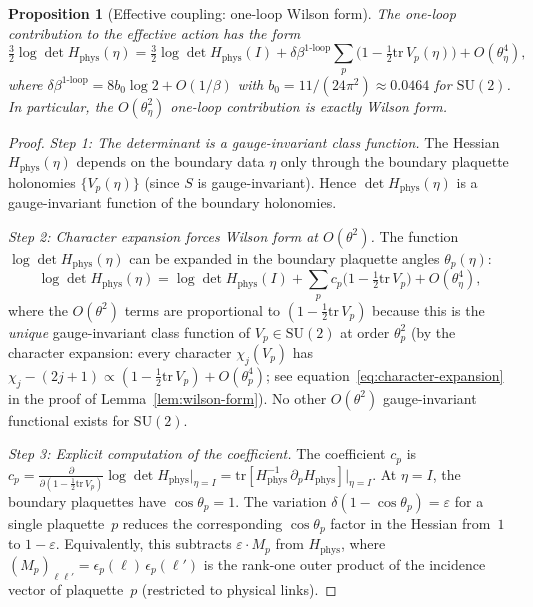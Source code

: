 \documentclass[11pt]{article}
\newtheorem{proposition}[theorem]{Proposition}
\theoremstyle{definition}
\newcommand{\SU}{\mathrm{SU}}
\newcommand{\tr}{\mathrm{tr}}
\begin{document}
\begin{proposition}[Effective coupling: one-loop Wilson form]%
\label{prop:betaeff}
The one-loop contribution to the effective action has the form
\begin{equation}\label{eq:betaeff}
\tfrac{3}{2}\log\det H_{\mathrm{phys}}(\eta)
=\tfrac{3}{2}\log\det H_{\mathrm{phys}}(I)
+\delta\beta^{1\text{-loop}}\sum_p
\bigl(1-\tfrac{1}{2}\tr\,V_p(\eta)\bigr)
+O(\theta_\eta^4),
\end{equation}
where $\delta\beta^{1\text{-loop}}=8b_0\log 2+O(1/\beta)$
with $b_0=11/(24\pi^2)\approx 0.0464$ for $\SU(2)$.
In particular, the $O(\theta_\eta^2)$ one-loop contribution
is \emph{exactly Wilson form}.
\end{proposition}

\begin{proof}
\emph{Step 1: The determinant is a gauge-invariant class function.}
The Hessian $H_{\mathrm{phys}}(\eta)$ depends on the boundary data
$\eta$ only through the boundary plaquette holonomies
$\{V_p(\eta)\}$ (since $S$ is gauge-invariant).  Hence
$\det H_{\mathrm{phys}}(\eta)$ is a gauge-invariant function
of the boundary holonomies.

\emph{Step 2: Character expansion forces Wilson form at $O(\theta^2)$.}
The function $\log\det H_{\mathrm{phys}}(\eta)$ can be expanded
in the boundary plaquette angles $\theta_p(\eta)$:
\[
\log\det H_{\mathrm{phys}}(\eta)
=\log\det H_{\mathrm{phys}}(I)
+\sum_p c_p\bigl(1-\tfrac{1}{2}\tr\,V_p\bigr)
+O(\theta_\eta^4),
\]
where the $O(\theta^2)$ terms are proportional to
$(1-\frac{1}{2}\tr\,V_p)$ because this is the \emph{unique}
gauge-invariant class function of $V_p\in\SU(2)$ at order
$\theta_p^2$ (by the character expansion: every character
$\chi_j(V_p)$ has $\chi_j-(2j+1)\propto
(1-\frac{1}{2}\tr\,V_p)+O(\theta_p^4)$;
see equation~\eqref{eq:character-expansion} in the proof
of Lemma~\ref{lem:wilson-form}).
No other $O(\theta^2)$ gauge-invariant functional exists for
$\SU(2)$.

\emph{Step 3: Explicit computation of the coefficient.}
The coefficient $c_p$ is
$c_p=\frac{\partial}{\partial(1-\frac{1}{2}\tr\,V_p)}
\log\det H_{\mathrm{phys}}\big|_{\eta=I}
=\tr[H_{\mathrm{phys}}^{-1}\,\partial_p H_{\mathrm{phys}}]
\big|_{\eta=I}$.
At $\eta=I$, the boundary plaquettes have $\cos\theta_p=1$.
The variation $\delta(1-\cos\theta_p)=\varepsilon$ for a single
plaquette~$p$ reduces the corresponding $\cos\theta_p$
factor in the Hessian from~$1$ to $1-\varepsilon$.
Equivalently, this subtracts $\varepsilon\cdot M_p$ from
$H_{\mathrm{phys}}$, where $(M_p)_{\ell\ell'}
=\epsilon_p(\ell)\,\epsilon_p(\ell')$ is the rank-one
outer product of the incidence vector of plaquette~$p$
(restricted to physical links).


\end{proof}
\end{document}
